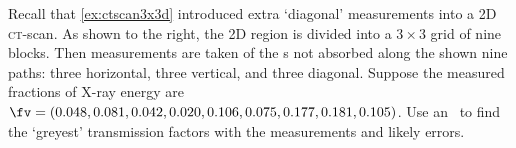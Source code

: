 \begin{example} \label{eg:ctscan3x3d2}
Recall that \cref{ex:ctscan3x3d} introduced extra `diagonal' measurements into a 2D \textsc{ct}-scan.
As shown to the right, the 2D region is divided into a \(3\times3\) grid of nine blocks.
Then measurements are taken of the s not absorbed along the shown nine paths: three horizontal, three vertical, and three diagonal.
Suppose the measured fractions of X-ray energy are \(\sloppy\fv=(0.048, 0.081, 0.042, 0.020, 0.106, 0.075, 0.177, 0.181, 0.105)\).
Use an \svd\ to find the `greyest' transmission factors  with the measurements and likely errors.


\end{example}
